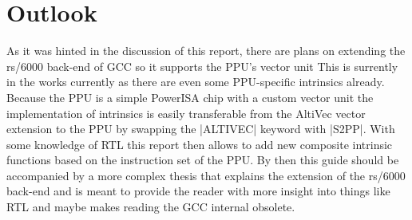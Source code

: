 \chapter{Outlook}
\label{chapter:outlook}

As it was hinted in the discussion of this report, there are plans on extending the rs/6000 back-end of GCC so it supports the PPU's vector unit
This is surrently in the works currently as there are even some PPU-specific intrinsics already. Because the PPU is a simple PowerISA chip with a custom vector unit the implementation of intrinsics is easily transferable from the AltiVec vector extension to the PPU by swapping the |ALTIVEC| keyword with |S2PP|. With some knowledge of RTL this report then allows to add new composite intrinsic functions based on the instruction set of the PPU. By then this guide should be accompanied by a more complex thesis that explains the extension of the rs/6000 back-end and is meant to provide the reader with more insight into things like RTL and maybe makes reading the GCC internal obsolete.
